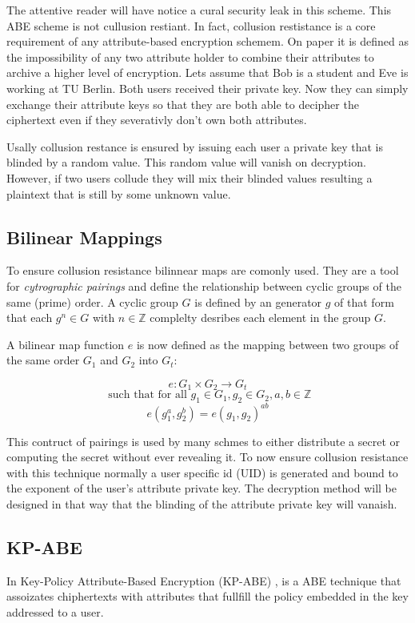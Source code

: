 The attentive reader will have notice a cural security leak in this scheme. This ABE scheme is not cullusion restiant. In fact, collusion restistance is a core requirement of any attribute-based encryption schemem. On paper it is defined as the impossibility of any two attribute holder to combine their attributes to archive a higher level of encryption. Lets assume that Bob is a student and Eve is working at TU Berlin. Both users received their private key. Now they can simply exchange their attribute keys so that they are both able to decipher the ciphertext even if they severativly don't own both attributes.  

Usally collusion restance is ensured by issuing each user a private key that is blinded by a random value. This random value will vanish on decryption. However, if two users collude they will mix their blinded values resulting a plaintext that is still by some unknown value. 

\subsection{Bilinear Mappings}
To ensure collusion resistance bilinnear maps are comonly used. They are a tool for \textit{cytrographic pairings} and define the relationship between cyclic groups of the same (prime) order. A cyclic group $G$ is defined by an generator $g$ of that form that each $g^n \in G$ with $n \in \mathbb{Z}$ complelty desribes each element in the group $G$.

A bilinear map function $e$ is now defined as the mapping between two groups of the same order $G_1$ and $G_2$ into $G_t$:

$$ e : G_1 \times G_2 \rightarrow G_t $$
$$\text{ such that for all } g_1 \in G_1, g_2 \in G_2, a, b \in \mathbb{Z}$$
$$e(g_1^a, g_2^b) = e(g_1, g_2)^{ab}$$


This contruct of pairings is used by many schmes to either distribute a secret or computing the secret without ever revealing it. To now ensure collusion resistance with this technique normally a user specific id (UID) is generated and bound to the exponent of the user's attribute private key. The decryption method will be designed in that way that the blinding of the attribute private key will vanaish.   

\subsection{KP-ABE}
In Key-Policy Attribute-Based Encryption (KP-ABE) \cite{goyal2006attribute}, is a ABE technique that assoizates chiphertexts with attributes that fullfill the policy embedded in the key addressed to a user. 

